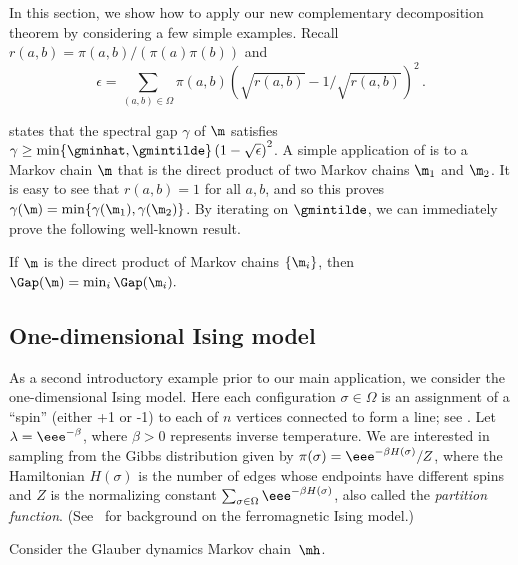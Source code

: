 In this section, we show how to apply our new complementary
decomposition theorem by considering a few simple examples.  Recall
$r(a,b) = \pi(a,b)/(\pi(a)\pi(b))$ and
\vspace{-.1in}
\[\epsilon = \sum_{(a,b)\in\Omega}\pi(a,b)\left(\sqrt{r(a,b)} -
1/\sqrt{r(a,b)}\right)^2\,.\]

\vspace{-.15in}

\noindent {} states that the spectral gap 
$\gamma$ of $\m$ satisfies $\gamma \geq \min\{\gminhat, 
\gmintilde\}\left(1 -\sqrt{\epsilon}\right)^2$. 
A simple application of  is to a Markov 
chain $\m$ that is the direct product of two Markov chains $\m_1$ and $ 
\m_2$.  It is easy to see that $r(a,b)=1$ for all $a,b$, and so this proves
$\gamma(\m) = \min\{\gamma(\m_1), \gamma(\m_2)\}$.  By 
iterating on $\gmintilde$, we can immediately prove the following well-known result. 

\begin{corollary}\label{cor:product}
If $\m$ is the direct product of Markov chains $\{\m_i\}$,
then  $\Gap(\m)=\min_i\Gap(\m_i).$
\end{corollary}

\subsection{One-dimensional Ising model}\label{sec:1DIsing}

As a second introductory example prior to our main application, we 
consider the one-dimensional Ising model.  Here each configuration 
$\sigma \in \Omega$ is an assignment of a ``spin'' (either +1 or -1) to 
each of $n$ vertices connected to form a line; see 
.  Let $\lambda = \eee^{-\beta}$, where $\beta > 0$ 
represents inverse temperature.  We are interested in sampling from the 
Gibbs distribution given by $\pi(\sigma) = \eee^{-\beta H(\sigma)}/Z$, 
where the Hamiltonian $H(\sigma)$ is the number of edges whose 
endpoints have different spins and $Z$ is the normalizing constant 
$\sum_{\sigma \in \Omega} \eee^{-\beta H(\sigma)}$, also called the 
\emph{partition function}. (See~\cite{LPW06} for background on the 
ferromagnetic Ising model.) 

Consider the Glauber dynamics Markov chain~$\mh$.   

\vspace{.1in}

